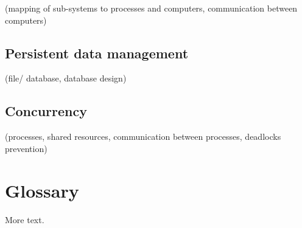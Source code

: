 \documentclass{Article}
\begin{document}
(mapping of sub-systems to processes and computers, communication between computers)

\subsection{Persistent data management}

(file/ database, database design)

\subsection{Concurrency}

(processes, shared resources, communication between processes, deadlocks prevention) 


\section{Glossary}

More text.
\end{document}
